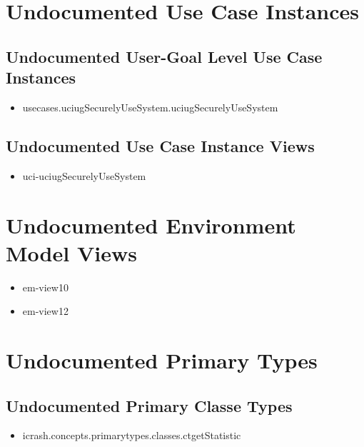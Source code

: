 \section[Undocumented Use Case Instances]{Undocumented Use Case Instances}


\subsection[Undocumented Use Case Instances - User-Goal Level]{Undocumented User-Goal Level Use Case Instances}
\begin{itemize}
\item usecases.uciugSecurelyUseSystem.uciugSecurelyUseSystem 
\end{itemize}


\subsection[Undocumented Use Case Instance Views]{Undocumented Use Case Instance Views}
\begin{itemize}
\item uci-uciugSecurelyUseSystem 
\end{itemize}




\section[Undocumented Environment Model Views]{Undocumented Environment Model Views}
\begin{itemize}
\item em-view10 
\item em-view12 
\end{itemize}


\section[Undocumented Primary Types]{Undocumented Primary Types}

\subsection[Undocumented Primary Classe Types]{Undocumented Primary Classe Types}
\begin{itemize}
\item icrash.concepts.primarytypes.classes.ctgetStatistic 
\end{itemize}





